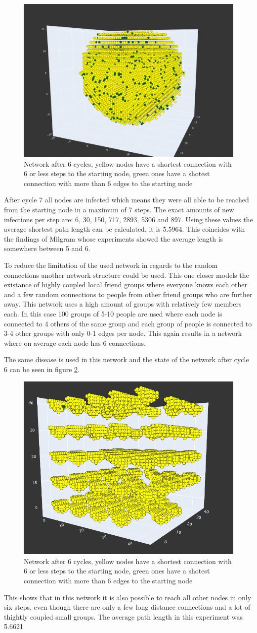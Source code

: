 \begin{figure}
    \centering
    \includegraphics[width=0.5\linewidth]{images/small_world_network.png}
    \caption{Network after 6 cycles, yellow nodes have a shortest connection with 6 or less steps to the starting node,
    green ones have a shotest connection with more than 6 edges to the starting node}
    \label{fig:small_world_network}
\end{figure}

After cycle 7 all nodes are infected which means they were all able to be reached from the starting node in a maximum of 7 steps. The exact amounts of new infections per step are: 6, 30, 150, 717, 2893, 5306 and 897. Using these values the average shortest path length can be calculated, it is \~5.5964. This coincides with the findings of Milgram \cite{smallWorld} whose experiments showed the average length is somewhere between 5 and 6.

To reduce the limitation of the used network in regards to the random connections another network structure could be used. This one closer models the existance of highly coupled local friend groups where everyone knows each other and a few random connections to people from other friend groups who are further away. This network uses a high amount of groups with relatively few members each. In this case 100 groups of 5-10 people are used where each node is connected to 4 others of the same group and each group of people is connected to 3-4 other groups with only 0-1 edges per node. This again results in a network where on average each node has 6 connections.

The same disease is used in this network and the state of the network after cycle 6 can be seen in figure \ref{fig:small_world_groups}.

\begin{figure}
    \centering
    \includegraphics[width=0.5\linewidth]{images/small_world_groups.png}
    \caption{Network after 6 cycles, yellow nodes have a shortest connection with 6 or less steps to the starting node,
    green ones have a shotest connection with more than 6 edges to the starting node}
    \label{fig:small_world_groups}
\end{figure}

This shows that in this network it is also possible to reach all other nodes in only six steps, even though there are only a few long distance connections and a lot of thightly coupled small groups. The average path length in this experiment was \~5.6621


